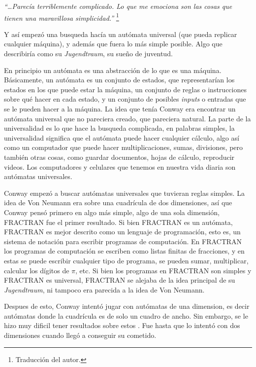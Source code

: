 \textit{``\dots Parec\'ia terriblemente complicado. Lo que me emociona son las cosas que tienen una maravillosa simplicidad.''} \footnote{Traducci\'on del autor.}

Y as\'i empez\'o una busqueda hac\'ia un aut\'omata universal (que pueda replicar cualquier m\'aquina), y adem\'as que fuera lo m\'as simple posible. Algo que describir\'ia como su \textit{Jugendtraum}, su sueño de juventud.

En principio un aut\'omata es una abstracci\'on de lo que es una m\'aquina. B\'asicamente, un aut\'omata es un conjunto de estados, que representar\'ian los estados en los que puede estar la m\'aquina, un conjunto de reglas o instrucciones sobre qu\'e hacer en cada estado, y un conjunto de posibles \textit{inputs} o entradas que se le pueden hacer a la m\'aquina. La idea que ten\'ia Conway era encontrar un aut\'omata universal que no pareciera creado, que pareciera natural. La parte de la universalidad es lo que hace la busqueda complicada, en palabras simples, la universalidad significa que el aut\'omata puede hacer cualquier c\'alculo, algo as\'i como un computador que puede hacer multiplicaciones, sumas, divisiones, pero tambi\'en otras cosas, como guardar documentos, hojas de c\'alculo, reproducir videos. Los computadores y celulares que tenemos en nuestra vida diaria son aut\'omatas universales.

Conway empez\'o a buscar autómatas universales que tuvieran reglas simples. La idea de Von Neumann era sobre una cuadr\'icula de dos dimensiones, as\'i que Conway pens\'o primero en algo m\'as simple, algo de una sola dimensi\'on, FRACTRAN fue el primer resultado. Si bien FRACTRAN es un aut\'omata, FRACTRAN es mejor descrito como un lenguaje de programaci\'on, esto es, un sistema de notaci\'on para escribir programas de computaci\'on. En FRACTRAN los programas de computaci\'on se escriben como listas finitas de fracciones, y en estas se puede escribir cualquier tipo de programa, se pueden sumar, multiplicar, calcular los d\'igitos de $\pi$, etc. Si bien los programas en FRACTRAN son simples y FRACTRAN es universal, FRACTRAN se alejaba de la idea principal de su \textit{Jugendtraum}, ni tampoco era parecida a la idea de Von Neumann.

Despues de esto, Conway intent\'o jugar con aut\'omatas de una dimension, es decir aut\'omatas donde la cuadr\'icula es de solo un cuadro de ancho. Sin embargo, se le hizo muy dificil tener resultados sobre estos \cite{Roberts2015-ur}. Fue hasta que lo intent\'o con dos dimensiones cuando lleg\'o a conseguir su cometido.

